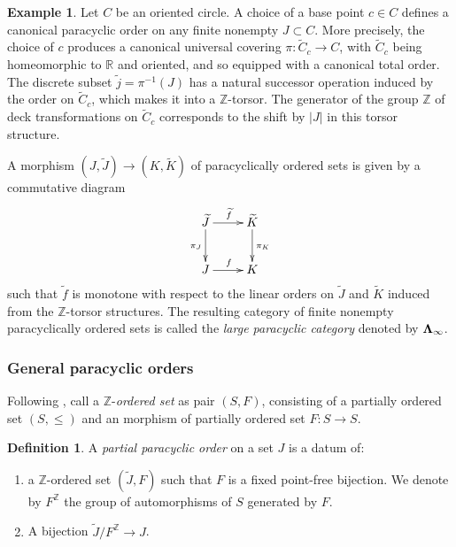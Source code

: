 \documentclass[english,11pt,leqno]{article}
\def\RR{\mathbb{R}}
\def\ZZ{\mathbb{Z}}
\theoremstyle{definition}
\newtheorem{defi}[thm]{Definition}
\newtheorem{exa}[thm]{Example}
\theoremstyle{remark}
\numberwithin{equation}{section}
\begin{document}
\begin{exa}\label{exa:paracyclic-exp}
Let $C$ be an oriented circle. A choice of a base point $c\in C$ defines a canonical 
paracyclic order on any finite nonempty $J\subset C$. More precisely, the choice of $c$
produces a canonical universal covering $\pi: \widetilde C_c\to C$, with $\widetilde C_c$ being
homeomorphic to $\RR$ and oriented, and so equipped with
a canonical total order. The discrete subset $\widetilde j=\pi^{-1}(J)$ has a natural successor operation 
induced by the  order on $\widetilde C_c$,  which makes it into a $\ZZ$-torsor.
 The generator of the group $\ZZ$ of deck transformations
on $\widetilde C_c$ corresponds to the shift by $|J|$ in this torsor structure. 
 
\end{exa}

A morphism $(J, \widetilde{J}) \to (K, \widetilde{K})$ of paracyclically ordered sets is given by a
commutative diagram 
\[
	\xymatrix{
		\widetilde{J} \ar[d]_{\pi_J} \ar[r]^{\widetilde{f}} & \ar[d]^{\pi_K} \widetilde{K}\\
		J \ar[r]^f &  K
	}
\]
such that $\widetilde{f}$ is monotone with respect to the linear orders on $\widetilde{J}$ and $\widetilde{K}$
induced from the $\ZZ$-torsor structures. 
The resulting category of finite nonempty paracyclically ordered
sets is called the {\em large paracyclic category} denoted by ${\bf \Lambda_{\infty}}$.

\subsubsection{General paracyclic orders}
Following \cite[\S 3.1]{HSS1}, call a $\ZZ$-{\em ordered set} as pair $(S,F)$, consisting of
a partially ordered set $(S,\leq)$ and an  morphism of partially ordered set $F: S\to S$. 


\begin{defi}
A {\em partial paracyclic order} on a set $J$ is a datum of:
\begin{enumerate}
\item  a $\ZZ$-ordered set $(\widetilde J, F)$
such that $F$ is a fixed point-free bijection. We denote by $F^\ZZ$ the group
of automorphisms of $S$ generated by $F$.

\item A bijection $\widetilde J/F^\ZZ\to J$. 

\end{enumerate}

\end{defi}
\end{document}
